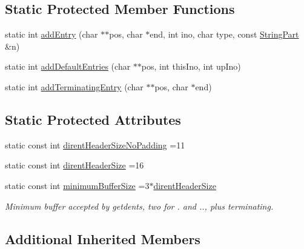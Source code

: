 \subsection*{Static Protected Member Functions}
\begin{DoxyCompactItemize}
\item 
static int \hyperlink{classmiosix_1_1_directory_base_a0f691e7e64473cb386783ccf2545ff41}{add\-Entry} (char $\ast$$\ast$pos, char $\ast$end, int ino, char type, const \hyperlink{classmiosix_1_1_string_part}{String\-Part} \&n)
\item 
static int \hyperlink{classmiosix_1_1_directory_base_aac875ba349b5e834a825ea06b2060904}{add\-Default\-Entries} (char $\ast$$\ast$pos, int this\-Ino, int up\-Ino)
\item 
static int \hyperlink{classmiosix_1_1_directory_base_a7daa9aedc5a0f6f0cc859e76c52af574}{add\-Terminating\-Entry} (char $\ast$$\ast$pos, char $\ast$end)
\end{DoxyCompactItemize}
\subsection*{Static Protected Attributes}
\begin{DoxyCompactItemize}
\item 
static const int \hyperlink{classmiosix_1_1_directory_base_af9d3fa9038ca46e67fa1de0d8439d8ac}{dirent\-Header\-Size\-No\-Padding} =11
\item 
static const int \hyperlink{classmiosix_1_1_directory_base_ad907c19d39fed139feee02f57189783c}{dirent\-Header\-Size} =16
\item 
\hypertarget{classmiosix_1_1_directory_base_a82be4b186b115f5ca877b6babc10908c}{static const int \hyperlink{classmiosix_1_1_directory_base_a82be4b186b115f5ca877b6babc10908c}{minimum\-Buffer\-Size} =3$\ast$\hyperlink{classmiosix_1_1_directory_base_ad907c19d39fed139feee02f57189783c}{dirent\-Header\-Size}}\label{classmiosix_1_1_directory_base_a82be4b186b115f5ca877b6babc10908c}

\begin{DoxyCompactList}\small\item\em Minimum buffer accepted by getdents, two for . and .., plus terminating. \end{DoxyCompactList}\end{DoxyCompactItemize}
\subsection*{Additional Inherited Members}


